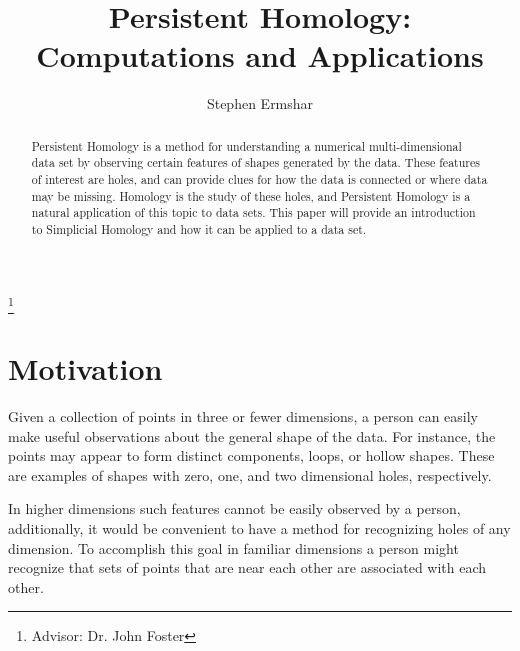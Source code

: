 

\title[Persistent Homology]{Persistent Homology: Computations and Applications}
\author{Stephen Ermshar}
\address{Walla Walla University}
\thanks{Advisor: Dr. John Foster}

\date{} %



\begin{abstract}
    Persistent Homology is a method for understanding a numerical multi-dimensional data set by observing certain features of shapes generated by the data.
    These features of interest are holes, and can provide clues for how the data is connected or where data may be missing.
    Homology is the study of these holes, and Persistent Homology is a natural application of this topic to data sets.
    This paper will provide an introduction to Simplicial Homology and how it can be applied to a data set.
\end{abstract}
\maketitle

\section{Motivation}

Given a collection of points in three or fewer dimensions, a person can easily make useful observations about the general shape of the data.
For instance, the points may appear to form distinct components, loops, or hollow shapes.
These are examples of shapes with zero, one, and two dimensional holes, respectively.

In higher dimensions such features cannot be easily observed by a person, additionally, it would be convenient to have a method for recognizing holes of any dimension.
To accomplish this goal in familiar dimensions a person might recognize that sets of points that are near each other are associated with each other.


%     

